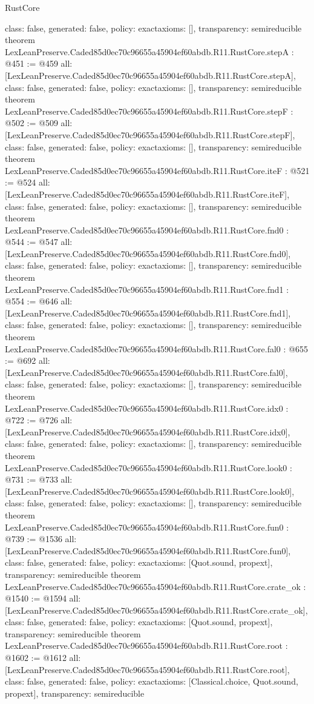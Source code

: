 \begin{lexlean}{RustCore}
\begin{coremodule}
{  class: false,
  generated: false,
  policy: exact{axioms: []},
  transparency: semireducible
}
theorem LexLeanPreserve.Caded85d0ec70c96655a45904ef60abdb.R11.RustCore.stepA : @451 := @459 {
  all: [LexLeanPreserve.Caded85d0ec70c96655a45904ef60abdb.R11.RustCore.stepA],
  class: false,
  generated: false,
  policy: exact{axioms: []},
  transparency: semireducible
}
theorem LexLeanPreserve.Caded85d0ec70c96655a45904ef60abdb.R11.RustCore.stepF : @502 := @509 {
  all: [LexLeanPreserve.Caded85d0ec70c96655a45904ef60abdb.R11.RustCore.stepF],
  class: false,
  generated: false,
  policy: exact{axioms: []},
  transparency: semireducible
}
theorem LexLeanPreserve.Caded85d0ec70c96655a45904ef60abdb.R11.RustCore.iteF : @521 := @524 {
  all: [LexLeanPreserve.Caded85d0ec70c96655a45904ef60abdb.R11.RustCore.iteF],
  class: false,
  generated: false,
  policy: exact{axioms: []},
  transparency: semireducible
}
theorem LexLeanPreserve.Caded85d0ec70c96655a45904ef60abdb.R11.RustCore.fnd0 : @544 := @547 {
  all: [LexLeanPreserve.Caded85d0ec70c96655a45904ef60abdb.R11.RustCore.fnd0],
  class: false,
  generated: false,
  policy: exact{axioms: []},
  transparency: semireducible
}
theorem LexLeanPreserve.Caded85d0ec70c96655a45904ef60abdb.R11.RustCore.fnd1 : @554 := @646 {
  all: [LexLeanPreserve.Caded85d0ec70c96655a45904ef60abdb.R11.RustCore.fnd1],
  class: false,
  generated: false,
  policy: exact{axioms: []},
  transparency: semireducible
}
theorem LexLeanPreserve.Caded85d0ec70c96655a45904ef60abdb.R11.RustCore.fal0 : @655 := @692 {
  all: [LexLeanPreserve.Caded85d0ec70c96655a45904ef60abdb.R11.RustCore.fal0],
  class: false,
  generated: false,
  policy: exact{axioms: []},
  transparency: semireducible
}
theorem LexLeanPreserve.Caded85d0ec70c96655a45904ef60abdb.R11.RustCore.idx0 : @722 := @726 {
  all: [LexLeanPreserve.Caded85d0ec70c96655a45904ef60abdb.R11.RustCore.idx0],
  class: false,
  generated: false,
  policy: exact{axioms: []},
  transparency: semireducible
}
theorem LexLeanPreserve.Caded85d0ec70c96655a45904ef60abdb.R11.RustCore.look0 : @731 := @733 {
  all: [LexLeanPreserve.Caded85d0ec70c96655a45904ef60abdb.R11.RustCore.look0],
  class: false,
  generated: false,
  policy: exact{axioms: []},
  transparency: semireducible
}
theorem LexLeanPreserve.Caded85d0ec70c96655a45904ef60abdb.R11.RustCore.fun0 : @739 := @1536 {
  all: [LexLeanPreserve.Caded85d0ec70c96655a45904ef60abdb.R11.RustCore.fun0],
  class: false,
  generated: false,
  policy: exact{axioms: [Quot.sound, propext]},
  transparency: semireducible
}
theorem LexLeanPreserve.Caded85d0ec70c96655a45904ef60abdb.R11.RustCore.crate_ok : @1540 := @1594 {
  all: [LexLeanPreserve.Caded85d0ec70c96655a45904ef60abdb.R11.RustCore.crate_ok],
  class: false,
  generated: false,
  policy: exact{axioms: [Quot.sound, propext]},
  transparency: semireducible
}
theorem LexLeanPreserve.Caded85d0ec70c96655a45904ef60abdb.R11.RustCore.root : @1602 := @1612 {
  all: [LexLeanPreserve.Caded85d0ec70c96655a45904ef60abdb.R11.RustCore.root],
  class: false,
  generated: false,
  policy: exact{axioms: [Classical.choice, Quot.sound, propext]},
  transparency: semireducible
}


\end{coremodule}
\end{lexlean}
